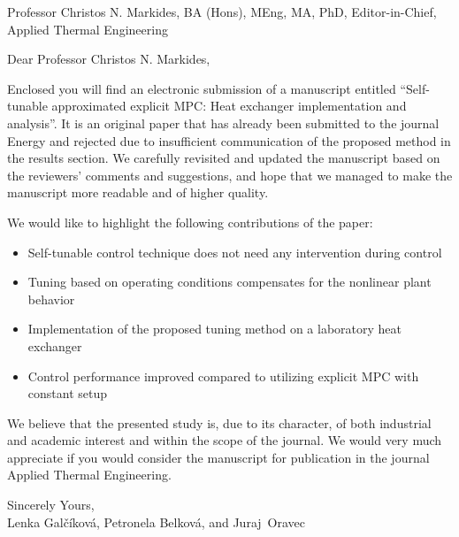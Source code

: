 \documentclass[a4paper,10pt]{letter}
\begin{document}
\pagestyle{headings}
\begin{letter}{Professor Christos N. Markides, BA (Hons), MEng, MA, PhD, Editor-in-Chief, Applied Thermal Engineering}

\opening{Dear Professor Christos N. Markides,}

Enclosed you will find an electronic submission of a manuscript entitled ``Self-tunable approximated explicit MPC: Heat exchanger implementation and analysis''. It is an original paper that has already been submitted to the journal Energy and rejected due to insufficient communication of the proposed method in the results section. We carefully revisited and updated the manuscript based on the reviewers' comments and suggestions, and hope that we managed to make the manuscript more readable and of higher quality. 

We would like to highlight the following contributions of the paper:
\begin{itemize}
	\item Self-tunable control technique does not need any intervention during control
	\item Tuning based on operating conditions compensates for the nonlinear plant behavior
	\item Implementation of the proposed tuning method on a laboratory heat exchanger 
	\item Control performance improved compared to utilizing explicit MPC with constant setup
\end{itemize}

We believe that the presented study is, due to its character, of both industrial and academic interest and within the scope of the journal. We would very much appreciate if you would consider the manuscript for publication in the journal Applied Thermal Engineering.

Sincerely Yours, \\
Lenka Gal\v{c}\'{i}kov\'{a}, Petronela Belkov\'{a}, and Juraj~Oravec

\end{letter}
\end{document}

